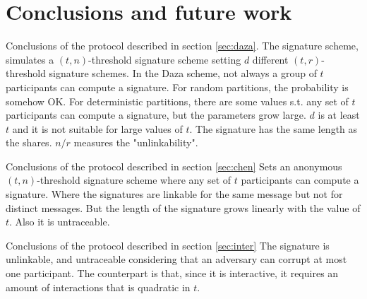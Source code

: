 \chapter{Conclusions and future work}
\label{chap:conc}

Conclusions of the protocol described in section \ref{sec:daza}.
The signature scheme, simulates a $(t,n)$-threshold signature scheme setting $d$ different $(t,r)$-threshold signature schemes.
In the Daza scheme, not always a group of $t$ participants can compute a signature. For random partitions, the probability is somehow OK.
For deterministic partitions, there are some values s.t. any set of $t$ participants can compute a signature, but the parameters grow large. $d$ is at least $t$ and it is not suitable for large values of $t$. The signature has the same length as the shares.
$n/r$ measures the "unlinkability".

Conclusions of the protocol described in section \ref{sec:chen} 
Sets an anonymous $(t,n)$-threshold signature scheme where any set of $t$ participants can compute a signature. Where the signatures are linkable for the same message but not for distinct messages. But the length of the signature grows linearly with the value of $t$. Also it is untraceable.

Conclusions of the protocol described in section \ref{sec:inter}
The signature is unlinkable, and untraceable considering that an adversary can corrupt at most one participant. The counterpart is that, since it is interactive, it requires an amount of interactions that is quadratic in $t$.